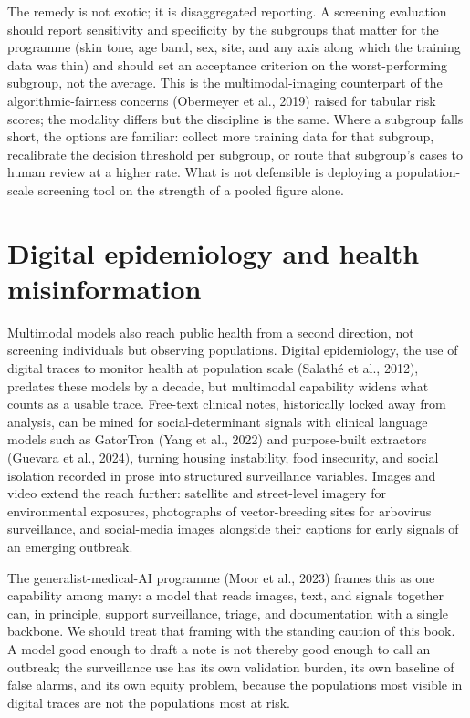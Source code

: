 \documentclass[
  letterpaper,
  11pt]{scrbook}
\begin{document}
The remedy is not exotic; it is disaggregated reporting. A screening
evaluation should report sensitivity and specificity by the subgroups
that matter for the programme (skin tone, age band, sex, site, and any
axis along which the training data was thin) and should set an
acceptance criterion on the worst-performing subgroup, not the average.
This is the multimodal-imaging counterpart of the algorithmic-fairness
concerns (Obermeyer et al., 2019) raised for tabular risk scores; the
modality differs but the discipline is the same. Where a subgroup falls
short, the options are familiar: collect more training data for that
subgroup, recalibrate the decision threshold per subgroup, or route that
subgroup's cases to human review at a higher rate. What is not
defensible is deploying a population-scale screening tool on the
strength of a pooled figure alone.

\section{Digital epidemiology and health
misinformation}\label{digital-epidemiology-and-health-misinformation}

Multimodal models also reach public health from a second direction, not
screening individuals but observing populations. Digital epidemiology,
the use of digital traces to monitor health at population scale
({Salathé et al.}, 2012), predates these models by a decade, but
multimodal capability widens what counts as a usable trace. Free-text
clinical notes, historically locked away from analysis, can be mined for
social-determinant signals with clinical language models such as
GatorTron ({Yang et al.}, 2022) and purpose-built extractors ({Guevara
et al.}, 2024), turning housing instability, food insecurity, and social
isolation recorded in prose into structured surveillance variables.
Images and video extend the reach further: satellite and street-level
imagery for environmental exposures, photographs of vector-breeding
sites for arbovirus surveillance, and social-media images alongside
their captions for early signals of an emerging outbreak.

The generalist-medical-AI programme ({Moor et al.}, 2023) frames this as
one capability among many: a model that reads images, text, and signals
together can, in principle, support surveillance, triage, and
documentation with a single backbone. We should treat that framing with
the standing caution of this book. A model good enough to draft a note
is not thereby good enough to call an outbreak; the surveillance use has
its own validation burden, its own baseline of false alarms, and its own
equity problem, because the populations most visible in digital traces
are not the populations most at risk.
\end{document}
